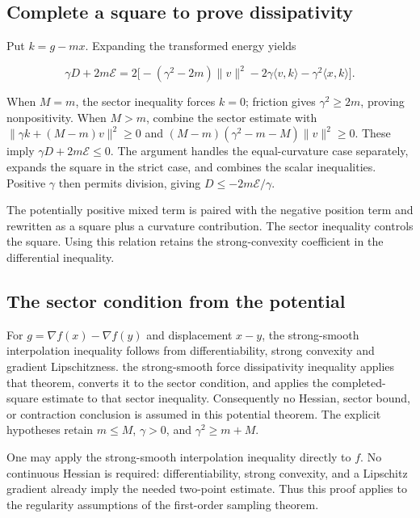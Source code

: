 \documentclass[11pt,a4paper]{report}
\begin{document}
\subsection{\texorpdfstring{Complete a square to prove dissipativity}{Complete a square to prove dissipativity}}
\label{report-step-KineticLangevin-PotentialContraction-lean-2}


Put \(k=g-mx\). Expanding the transformed energy yields

\[\gamma D+2m\mathcal E
=2\bigl[-(\gamma^2-2m)\|v\|^2-2\gamma\langle v,k\rangle-\gamma^2\langle x,k\rangle\bigr].\]

When \(M=m\), the sector inequality forces \(k=0\); friction gives \(\gamma^2\ge2m\), proving nonpositivity. When \(M>m\), combine the sector estimate with \(\|\gamma k+(M-m)v\|^2\ge0\) and \((M-m)(\gamma^2-m-M)\|v\|^2\ge0\). These imply \(\gamma D+2m\mathcal E\le0\). The argument handles the equal-curvature case separately, expands the square in the strict case, and combines the scalar inequalities. Positive \(\gamma\) then permits division, giving \(D\le-2m\mathcal E/\gamma\).



The potentially positive mixed term is paired with the negative position term and rewritten as a square plus a curvature contribution. The sector inequality controls the square. Using this relation retains the strong-convexity coefficient in the differential inequality.

\subsection{\texorpdfstring{The sector condition from the potential}{The sector condition from the potential}}
\label{report-step-KineticLangevin-PotentialContraction-lean-3}


For \(g=\nabla f(x)-\nabla f(y)\) and displacement \(x-y\), the strong-smooth interpolation inequality follows from differentiability, strong convexity and gradient Lipschitzness. the strong-smooth force dissipativity inequality applies that theorem, converts it to the sector condition, and applies the completed-square estimate to that sector inequality. Consequently no Hessian, sector bound, or contraction conclusion is assumed in this potential theorem. The explicit hypotheses retain \(m\le M\), \(\gamma>0\), and \(\gamma^2\ge m+M\).



One may apply the strong-smooth interpolation inequality directly to \(f\). No continuous Hessian is required: differentiability, strong convexity, and a Lipschitz gradient already imply the needed two-point estimate. Thus this proof applies to the regularity assumptions of the first-order sampling theorem.
\end{document}

